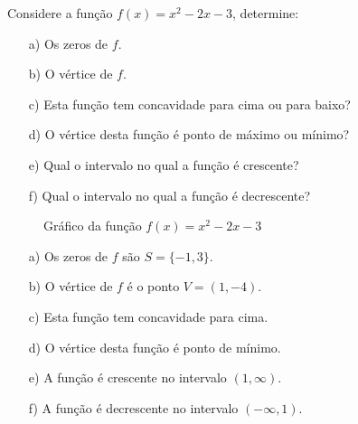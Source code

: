 \begin{exem}
Considere a função $f(x)= x^2 - 2x - 3$, determine:
\begin{enumerate}
\item [a)] Os zeros de $f$.
\item [b)] O vértice de $f$.
\item [c)] Esta função tem concavidade para cima ou para baixo?
\item [d)] O vértice desta função é ponto de máximo ou mínimo?
\item [e)] Qual o intervalo no qual a função é crescente?
\item [f)] Qual o intervalo no qual a função é decrescente?
\end{enumerate}
  \begin{figure}[H]
  \centering
   \caption{Gráfico da função $f(x)= x^2 - 2x - 3$}
  \end{figure}
\end{exem}

\begin{resol}
\begin{enumerate}
\item [a)] Os zeros de $f$ são $S= \{-1, 3\}$.
\item [b)] O vértice de $f$ é o ponto $V= (1, -4)$.
\item [c)] Esta função tem concavidade para cima.
\item [d)] O vértice desta função é ponto de mínimo.
\item [e)] A função é crescente no intervalo $(1, \infty)$.
\item [f)] A função é decrescente no intervalo $(- \infty, 1)$.
\end{enumerate}
\end{resol}

